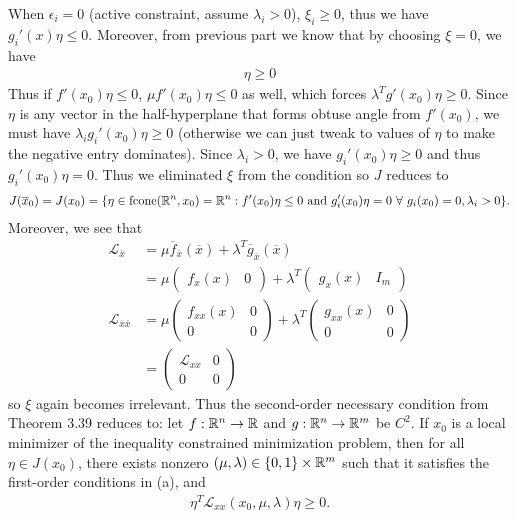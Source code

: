 \documentclass[12pt]{article}
\begin{document}
\begin{problem}[1]
\begin{enumerate}[label=(\alph*)]
When  $ \epsilon_i=0$ (active constraint, assume $ \lambda_i>0$), $ \xi_i \geq 0$, thus we have $ g_i'(x) \eta \leq 0$. Moreover, from previous part we know that by choosing $ \xi = 0$, we have
 \begin{align*}
	 [\mu f'(x_0)+\lambda^{T}g'(x_0)] \eta \geq 0
\end{align*}
Thus if $ f'(x_0) \eta \leq 0$, $ \mu f'(x_0) \eta \leq 0$ as well, which forces $ \lambda^{T} g'(x_0) \eta \geq 0$. Since $ \eta$ is any vector in the half-hyperplane that forms obtuse angle from $ f'(x_0)$, we must have $ \lambda_i g_i'(x_0) \eta \geq 0$ (otherwise we can just tweak to values of $ \eta$ to make the negative entry dominates). Since $ \lambda_i>0$, we have $ g_i'(x_0) \eta \geq 0$ and thus $ g_i'(x_0) \eta = 0$. Thus we eliminated $ \xi$ from the condition so $ J$ reduces to
\begin{align*}
	J(\overline{x}_0)=J(x_0)= \{\eta \in \fcone( \rr^{n}, x_0)=\rr^{n}: f'(x_0) \eta \leq 0 \text{ and } g_i'(x_0) \eta = 0 \ \forall \ g_i(x_0)=0, \lambda_i>0 \}. 
\end{align*}
Moreover, we see that
\begin{align*}
	\mathscr{L}_{\overline{x}} &= \mu \overline{f}_{\overline{x}}(\overline{x}) + \lambda^{T} \overline{g}_{\overline{x}}(\overline{x}) \\
				   &= \mu \begin{pmatrix} f_x(x)&0 \end{pmatrix} + \lambda^{T} \begin{pmatrix} g_x(x) & I_m \end{pmatrix}  \\
	\mathscr{L}_{\overline{x}\overline{x}} &= \mu \begin{pmatrix} f_{x x}(x)&0\\0&0 \end{pmatrix} + \lambda^{T} \begin{pmatrix} g_{x x}(x)&0\\0&0 \end{pmatrix}  \\
					       &= \begin{pmatrix}  \mathscr{L}_{x x}&0\\0&0 \end{pmatrix} 
\end{align*}
so $ \xi$ again becomes irrelevant. Thus the second-order necessary condition from Theorem 3.39 reduces to: let $ f:\mathbb{R}^{n} \to \mathbb{R}$ and $ g:\mathbb{R}^{n} \to \mathbb{R}^{m}$ be $ C^2$. If $ x_0$ is a local minimizer of the inequality constrained minimization problem, then for all $ \eta \in J(x_0)$, there exists nonzero $ (\mu,\lambda) \in \{0,1\} \times \mathbb{R}^{m} $ such that it satisfies the first-order conditions in (a), and
\begin{align*}
	\eta^{T} \mathscr{L}_{x x}(x_0,\mu,\lambda)\eta \geq 0.
\end{align*}
\end{enumerate}
\end{problem}
\end{document}
